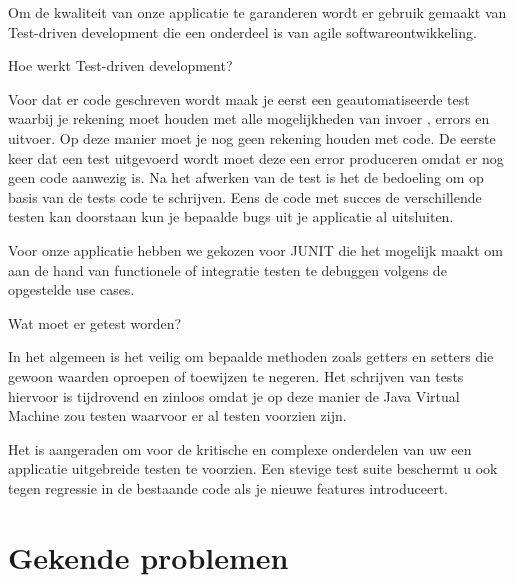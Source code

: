 \documentclass[pdftex,a4paper,12pt,twoside]{report}
\begin{document}
Om de kwaliteit van onze applicatie te garanderen wordt er gebruik gemaakt van Test-driven development die een onderdeel is van agile softwareontwikkeling.

Hoe werkt Test-driven development?

Voor dat er code geschreven wordt maak je eerst een geautomatiseerde test waarbij je rekening moet houden met alle mogelijkheden van invoer , errors en uitvoer. Op deze manier moet je nog geen rekening houden met code.
De eerste keer dat een test uitgevoerd wordt moet deze een error produceren omdat er nog geen code aanwezig is.
Na het afwerken van de test is het de bedoeling om op basis van de tests code te schrijven.
Eens de code met succes de verschillende testen kan doorstaan kun je bepaalde bugs uit je applicatie al uitsluiten.

Voor onze applicatie hebben we gekozen voor JUNIT die het mogelijk maakt om aan de hand van functionele of integratie testen te debuggen volgens de opgestelde use cases.


Wat moet er getest worden?

In het algemeen is het veilig om bepaalde methoden zoals getters en setters die gewoon waarden oproepen of toewijzen te negeren. Het schrijven van tests hiervoor is tijdrovend en zinloos omdat je op deze manier de Java Virtual Machine zou testen waarvoor er al testen voorzien zijn.

Het is aangeraden om voor de kritische en complexe onderdelen van uw een applicatie uitgebreide testen te voorzien. Een stevige test suite beschermt u ook tegen regressie in de bestaande code als je nieuwe features introduceert.




\chapter{Gekende problemen}
\end{document}
